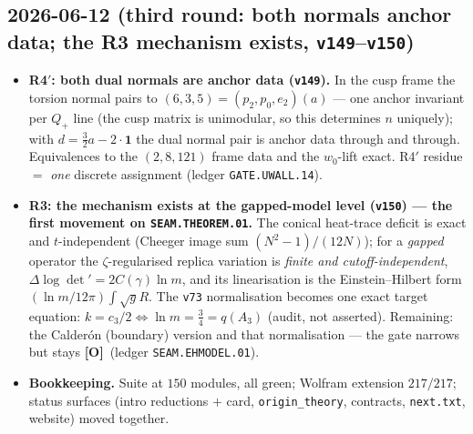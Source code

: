 \documentclass[11pt]{article}
\providecommand{\mO}{\textbf{[O]}}\providecommand{\mX}{\textbf{[X]}}
\providecommand{\vref}[1]{\texttt{#1}}
\providecommand{\cthree}{c_3}\providecommand{\phiz}{\varphi_0^{\mathrm{ret}}}
\begin{document}
\subsection*{2026-06-12 (third round: both normals anchor data; the R3 mechanism exists, \vref{v149}--\vref{v150})}
\begin{itemize}
\item \textbf{R4$'$: both dual normals are anchor data (\vref{v149}).} In the cusp frame
  the torsion normal pairs to $(6,3,5)=(p_2,p_0,e_2)(a)$ --- one anchor invariant per
  $Q_+$ line (the cusp matrix is unimodular, so this determines $n$ uniquely); with
  $d=\tfrac32a-2\cdot\mathbf1$ the dual normal pair is anchor data through and through.
  Equivalences to the $(2,8,121)$ frame data and the $w_0$-lift exact. R4$'$ residue $=$
  \emph{one} discrete assignment (ledger \texttt{GATE.UWALL.14}).
\item \textbf{R3: the mechanism exists at the gapped-model level (\vref{v150}) --- the
  first movement on \texttt{SEAM.THEOREM.01}.} The conical heat-trace deficit is exact
  and $t$-independent (Cheeger image sum $(N^2{-}1)/(12N)$); for a \emph{gapped}
  operator the $\zeta$-regularised replica variation is \emph{finite and
  cutoff-independent}, $\Delta\log\det'=2C(\gamma)\ln m$, and its linearisation is the
  Einstein--Hilbert form $(\ln m/12\pi)\int\!\sqrt gR$. The \vref{v73} normalisation
  becomes one exact target equation: $k=\cthree/2\Leftrightarrow\ln m=\tfrac34=q(A_3)$
  (audit, not asserted). Remaining: the Calder\'on (boundary) version and that
  normalisation --- the gate narrows but stays \mO\ (ledger \texttt{SEAM.EHMODEL.01}).
\item \textbf{Bookkeeping.} Suite at $150$ modules, all green; Wolfram extension
  $217/217$; status surfaces (intro reductions $+$ card, \texttt{origin\_theory},
  contracts, \texttt{next.txt}, website) moved together.
\end{itemize}
\end{document}
